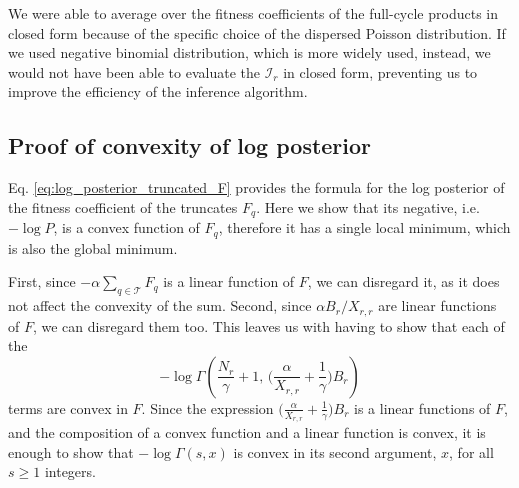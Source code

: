 \documentclass[letter,10pt,oneside]{article}
\newcommand{\be}{\begin{equation*}}
\newcommand{\ee}{\end{equation*}}
\newcommand{\+}{^\dagger}
\newcommand{\refeq}[1]{Eq. \ref{#1}}
\begin{document}
\begin{appendix}
We were able to average over the fitness coefficients of the full-cycle products in closed form because of the specific choice of the dispersed Poisson distribution. If we used negative binomial distribution, which is more widely used, instead, we would not have been able to evaluate the $\mathcal{I}_r$ in closed form, preventing us to improve the efficiency of the inference algorithm.

\subsection{Proof of convexity of log posterior}
\label{app:convexity}
\refeq{eq:log_posterior_truncated_F} provides the formula for the log posterior of the fitness coefficient of the truncates $F_q$. Here we show that its negative, i.e. $-\log P$, is a convex function of $F_q$, therefore it has a single local minimum, which is also the global minimum.

First, since $-\alpha \sum_{q\in\mathcal{T}} F_q$ is a linear function of $F$, we can disregard it, as it does not affect the convexity of the sum. Second, since $\alpha B_r /X_{r,r}$ are linear functions of $F$, we can disregard them too. This leaves us with having to show that each of the 
\be
  - \log\Gamma\!\left(\frac{N_r}{\gamma} + 1,\, \Big(\frac{\alpha}{X_{r,r}} + \frac{1}{\gamma}\Big)B_r\right)
\ee
terms are convex in $F$. Since the expression $\Big(\frac{\alpha}{X_{r,r}} + \frac{1}{\gamma}\Big)B_r$ is a linear functions of $F$, and the composition of a convex function and a linear function is convex, it is enough to show that $-\log \Gamma(s, x)$ is convex in its second argument, $x$, for all $s \geq 1$ integers.


\end{appendix}
\end{document}
